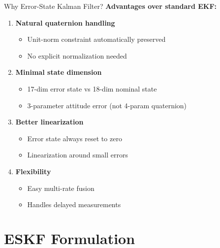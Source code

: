 \documentclass{beamer}
\begin{document}
\begin{frame}{Why Error-State Kalman Filter?}
\textbf{Advantages over standard EKF:}

\begin{enumerate}
    \item \textbf{Natural quaternion handling}
    \begin{itemize}
        \item Unit-norm constraint automatically preserved
        \item No explicit normalization needed
    \end{itemize}
    
    \vspace{0.3cm}
    \item \textbf{Minimal state dimension}
    \begin{itemize}
        \item 17-dim error state vs 18-dim nominal state
        \item 3-parameter attitude error (not 4-param quaternion)
    \end{itemize}
    
    \vspace{0.3cm}
    \item \textbf{Better linearization}
    \begin{itemize}
        \item Error state always reset to zero
        \item Linearization around small errors
    \end{itemize}
    
    \vspace{0.3cm}
    \item \textbf{Flexibility}
    \begin{itemize}
        \item Easy multi-rate fusion
        \item Handles delayed measurements
    \end{itemize}
\end{enumerate}
\end{frame}

\section{ESKF Formulation}
\end{document}
